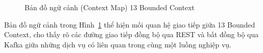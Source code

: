 \documentclass[../DoAn.tex]{subfiles}
\begin{document}
{\begin{figure}[!H]
    \centering
    \caption{Bản đồ ngữ cảnh (Context Map) 13 Bounded Context}
    \label{fig:context-map}
\end{figure}

Bản đồ ngữ cảnh trong Hình~\ref{fig:context-map} thể hiện mối quan hệ giao tiếp giữa 13
Bounded Context, cho thấy rõ các đường giao tiếp đồng bộ qua REST và bất đồng bộ qua Kafka
giữa những dịch vụ có liên quan trong cùng một luồng nghiệp vụ.





}
\end{document}
